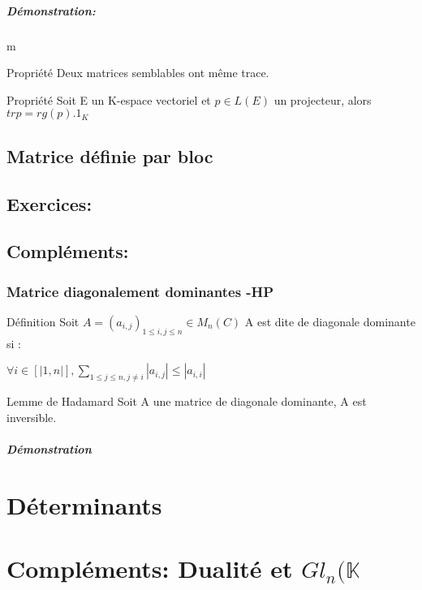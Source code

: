 \documentclass{book}
\begin{document}
\paragraph{Démonstration: }
m
\begin{Propriété}[]{Propriété}{}
Deux matrices semblables ont même trace.
\end{Propriété}
\begin{Propriété}[]{Propriété}{}
Soit E un K-espace vectoriel et \(p \in L(E)\) un projecteur, alors 
\\ \(tr p = rg(p).1_{K}\)
\end{Propriété}
 \section{Matrice définie par bloc}
\section{Exercices:}


\section{Compléments:}
\subsection{Matrice diagonalement dominantes -HP}
\begin{Définition}[]{Définition}{}
Soit \(A=(a_{i,j})_{1\leq i,j\leq n} \in M_{n}(C)\)
A est dite de diagonale dominante si : 
\\
\begin{center}
\(\forall i \in [|1,n|], \sum_{1 \leq j \leq n ,j\neq i}|a_{i,j}| \le |a_{i,i}|\)
\end{center}
\end{Définition}
\begin{Propriété}[]{Lemme de Hadamard}{}
Soit A une matrice de diagonale dominante, A est inversible.
\end{Propriété}
\paragraph{Démonstration}
\chapter{Déterminants}
\chapter{Compléments: Dualité et \(Gl_{n}(\mathbb{K}\)}
\end{document}
